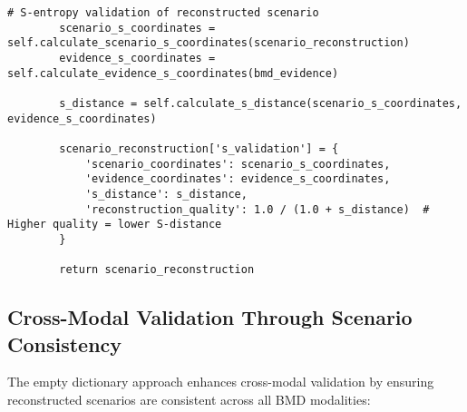 \documentclass[12pt,a4paper]{article}
\begin{document}
\begin{lstlisting}[style=pythonstyle, caption=Consciousness Archaeology Implementation]
        # S-entropy validation of reconstructed scenario
        scenario_s_coordinates = self.calculate_scenario_s_coordinates(scenario_reconstruction)
        evidence_s_coordinates = self.calculate_evidence_s_coordinates(bmd_evidence)
        
        s_distance = self.calculate_s_distance(scenario_s_coordinates, evidence_s_coordinates)
        
        scenario_reconstruction['s_validation'] = {
            'scenario_coordinates': scenario_s_coordinates,
            'evidence_coordinates': evidence_s_coordinates,
            's_distance': s_distance,
            'reconstruction_quality': 1.0 / (1.0 + s_distance)  # Higher quality = lower S-distance
        }
        
        return scenario_reconstruction
\end{lstlisting}

\subsection{Cross-Modal Validation Through Scenario Consistency}

The empty dictionary approach enhances cross-modal validation by ensuring reconstructed scenarios are consistent across all BMD modalities:
\end{document}
